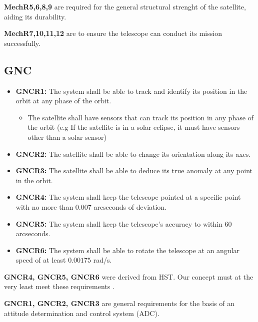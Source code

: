 \textbf{MechR5,6,8,9} are required for the general structural strenght of the satellite, aiding its durability.

\textbf{MechR7,10,11,12} are to ensure the telescope can conduct its mission successfully.
\subsection{GNC}
\begin{itemize}
    \item \textbf{GNCR1:} The system shall be able to track and identify its position in the orbit at any phase of the orbit.
    \begin{itemize}
        \item The satellite shall have sensors that can track its position in any phase of the orbit (e.g If the satellite is in a solar eclipse, it must have sensors other than a solar sensor)
    \end{itemize}
    \item \textbf{GNCR2:} The satellite shall be able to change its orientation along its axes. 
    \item \textbf{GNCR3:} The satellite shall be able to deduce its true anomaly at any point in the orbit.
    \item \textbf{GNCR4:} The system shall keep the telescope pointed at a specific point with no more than 0.007 arcseconds of deviation.
    \item \textbf{GNCR5:} The system shall keep the telescope's accuracy to within 60 arcseconds.
    \item \textbf{GNCR6:} The system shall be able to rotate the telescope at an angular speed of at least $0.00175$ rad/s.
\end{itemize}
\textbf{GNCR4, GNCR5, GNCR6} were derived from HST. Our concept must at the very least meet these requirements \cite{HubbleADC}.

\textbf{GNCR1, GNCR2, GNCR3} are general requirements for the basis of an attitude determination and control system (ADC).
